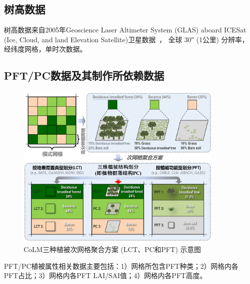 \subsection{树高数据}\label{树高数据}
树高数据来自2005年Geoscience Laser Altimeter System (GLAS) aboard ICESat 
(Ice, Cloud, and land Elevation Satellite)卫星数据~\citep{simard2011mapping}，
全球 \ang{;;30} (1公里) 分辨率，经纬度网格，单时次数据。

\subsection{PFT/PC数据及其制作所依赖数据}\label{PFTPC数据及其依赖数据}
{
  \begin{figure}[htbp]
    \centering
    \includegraphics[width=0.9\textwidth]{Figures/基础数据/次网格聚合方案.png}
    \caption[CoLM三种植被次网格聚合方案 (LCT、PC和PFT) 示意图]{CoLM三种植被次网格聚合方案 (LCT、PC和PFT) 示意图}%
    \label{fig:次网格聚合方案}
  \end{figure}
}

PFT/PC植被属性相关数据主要包括：1）网格所包含PFT种类；2）网格内各PFT占比；3）网格内各PFT LAI/SAI值；4）网格内各PFT高度。

